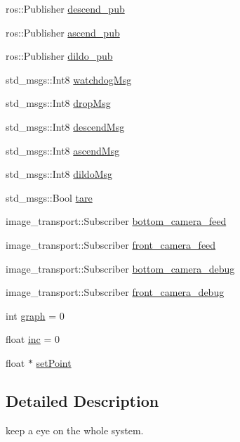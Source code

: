 \begin{DoxyCompactItemize}
\item 
ros\+::\+Publisher \hyperlink{classWatchdog_afbc0f1fa165bbf2e9e24fcec2b3f5687}{descend\+\_\+pub}
\item 
ros\+::\+Publisher \hyperlink{classWatchdog_a389bf2aba547e6f95a6589236c7ae4b5}{ascend\+\_\+pub}
\item 
ros\+::\+Publisher \hyperlink{classWatchdog_a54eafa45e14774efcb267c3174a88e97}{dildo\+\_\+pub}
\item 
std\+\_\+msgs\+::\+Int8 \hyperlink{classWatchdog_aa9a4d6844cc7c8565bf1a80e4c80acf1}{watchdog\+Msg}
\item 
std\+\_\+msgs\+::\+Int8 \hyperlink{classWatchdog_ac3c684605e0a6aaf0256618c800c1533}{drop\+Msg}
\item 
std\+\_\+msgs\+::\+Int8 \hyperlink{classWatchdog_aa16307d8bab30f076448618f79cfaa8e}{descend\+Msg}
\item 
std\+\_\+msgs\+::\+Int8 \hyperlink{classWatchdog_a4e1a6ecc9b4f30fa9e6ebae4fb74eb69}{ascend\+Msg}
\item 
std\+\_\+msgs\+::\+Int8 \hyperlink{classWatchdog_afc886d9b35091b31e733492a2c2a9256}{dildo\+Msg}
\item 
std\+\_\+msgs\+::\+Bool \hyperlink{classWatchdog_ab2e913fca8a76684142472687ed92989}{tare}
\item 
image\+\_\+transport\+::\+Subscriber \hyperlink{classWatchdog_ae6c487d0a7ad98b66426cf0de1d4641d}{bottom\+\_\+camera\+\_\+feed}
\item 
image\+\_\+transport\+::\+Subscriber \hyperlink{classWatchdog_a1c9bd1f1f08c7cd78a442f071e2baa8e}{front\+\_\+camera\+\_\+feed}
\item 
image\+\_\+transport\+::\+Subscriber \hyperlink{classWatchdog_a72967c4aeec88b995ab7ec71a15f5702}{bottom\+\_\+camera\+\_\+debug}
\item 
image\+\_\+transport\+::\+Subscriber \hyperlink{classWatchdog_a7859b793281678f2dbef7a7f902e97c4}{front\+\_\+camera\+\_\+debug}
\item 
int \hyperlink{classWatchdog_a4f7cb13643cd104c5bf10c3858175737}{graph} = 0
\item 
float \hyperlink{classWatchdog_a1dfdc172bb68d432a8319bc2420fda23}{inc} = 0
\item 
float $\ast$ \hyperlink{classWatchdog_a4eacd86a0a265e25fda37e11be28eff2}{set\+Point}
\end{DoxyCompactItemize}


\subsection{Detailed Description}
keep a eye on the whole system. 

